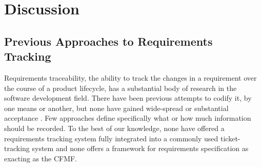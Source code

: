 \documentclass[letterpaper,10pt]{article}
\begin{document}
	\section{Discussion}
        \label{sec:discussion}
	
        \subsection{Previous Approaches to Requirements Tracking}

            Requirements traceability, the ability to track the changes in 
            a requirement over the course of a product lifecycle, has a 
            substantial body of research in the software development field.  
            There have been previous attempts to codify it, by one means or 
            another, but none have gained wide-spread or substantial 
            acceptance  \cite{ameche_ketabchi,ramesh_stubbs}.  Few 
            approaches define specifically what or how much information 
            should be recorded.  To the best of our knowledge, none have 
            offered a requirements tracking system fully integrated into a 
            commonly used ticket-tracking system \cite{ameche_ketabchi} and 
            none offers a framework for requirements specification as 
            exacting as the CFMF.
\end{document}

